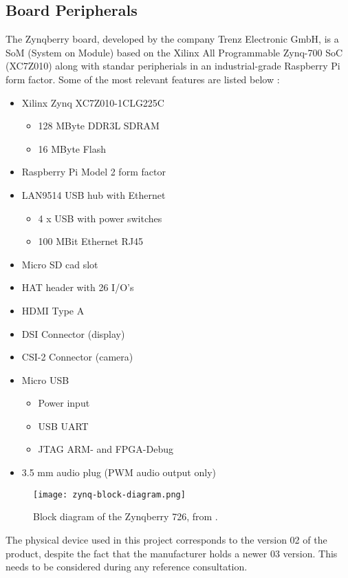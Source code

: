 \subsection{Board Peripherals}

The Zynqberry board, developed by the company Trenz Electronic GmbH, is a SoM (System on Module)
based on the Xilinx All Programmable Zynq-700 SoC (XC7Z010) along with standar peripherials in an
industrial-grade Raspberry Pi form factor. Some of the most relevant features are listed below
\cite{zynq-main}:

\begin{itemize}
	\item Xilinx Zynq XC7Z010-1CLG225C
	\begin{itemize}
		\item 128 MByte DDR3L SDRAM
		\item 16 MByte Flash
	\end{itemize}
	\item Raspberry Pi Model 2 form factor
	\item LAN9514 USB hub with Ethernet
	\begin{itemize}
		\item 4 x USB with power switches
		\item 100 MBit Ethernet RJ45
	\end{itemize}
	\item Micro SD cad slot
	\item HAT header with 26 I/O's
	\item HDMI Type A
	\item DSI Connector (display)
	\item CSI-2 Connector (camera)
	\item Micro USB
	\begin{itemize}
		\item Power input
		\item USB UART
		\item JTAG ARM- and FPGA-Debug
	\end{itemize}
	\item 3.5 mm audio plug (PWM audio output only)
\end{itemize}

\begin{figure}[htp]
	\centering
	\texttt{[image: zynq-block-diagram.png]}
	\caption{Block diagram of the Zynqberry 726, from \cite{zynq-trm}.}
	\label{fig:zynqblock}
\end{figure}

The physical device used in this project corresponds to the version 02 of the product, despite the
fact that the manufacturer holds a newer 03 version. This needs to be considered during any
reference consultation.


